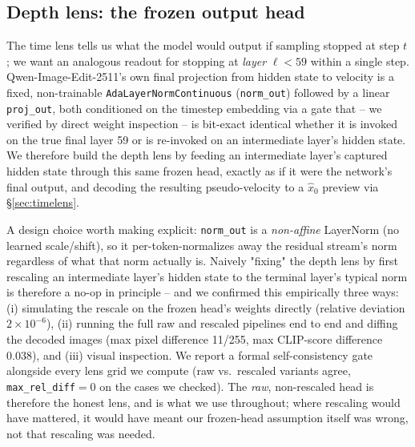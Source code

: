 \documentclass[10pt,twocolumn]{article}
\newcommand{\model}{Qwen-Image-Edit-2511}
\begin{document}
\subsection{Depth lens: the frozen output head}\label{sec:depthlens}
The time lens tells us what the model would output if sampling stopped
at step $t$; we want an analogous readout for stopping at \emph{layer}
$\ell < 59$ within a single step. \model{}'s own final projection from
hidden state to velocity is a fixed, non-trainable
\texttt{AdaLayerNormContinuous} (\texttt{norm\_out}) followed by a linear
\texttt{proj\_out}, both conditioned on the timestep embedding via a
gate that -- we verified by direct weight inspection -- is bit-exact
identical whether it is invoked on the true final layer 59 or is
re-invoked on an intermediate layer's hidden state. We therefore build
the depth lens by feeding an intermediate layer's captured hidden state
through this same frozen head, exactly as if it were the network's
final output, and decoding the resulting pseudo-velocity to a
$\hat{x}_0$ preview via \S\ref{sec:timelens}.

A design choice worth making explicit: \texttt{norm\_out} is a
\emph{non-affine} LayerNorm (no learned scale/shift), so it
per-token-normalizes away the residual stream's norm regardless of what
that norm actually is. Naively "fixing" the depth lens by first
rescaling an intermediate layer's hidden state to the terminal layer's
typical norm is therefore a no-op in principle -- and we confirmed this
empirically three ways: (i) simulating the rescale on the frozen head's
weights directly (relative deviation $2\times10^{-6}$), (ii) running the
full raw and rescaled pipelines end to end and diffing the decoded
images (max pixel difference 11/255, max CLIP-score difference 0.038),
and (iii) visual inspection. We report a formal self-consistency gate
alongside every lens grid we compute (raw vs.\ rescaled variants agree,
\texttt{max\_rel\_diff}$=0$ on the cases we checked). The \emph{raw},
non-rescaled head is therefore the honest lens, and is what we use
throughout; where rescaling would have mattered, it would have meant our
frozen-head assumption itself was wrong, not that rescaling was needed.
\end{document}
